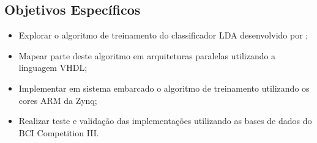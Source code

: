 \subsection{Objetivos Específicos}

\begin{itemize}
	\item Explorar o algoritmo de treinamento do classificador LDA desenvolvido por \cite{F.Lotte};
	\item Mapear parte deste algoritmo em arquiteturas paralelas utilizando a linguagem VHDL;
	\item Implementar em sistema embarcado o algoritmo de treinamento utilizando os cores ARM da Zynq;
	\item Realizar teste e validação das implementações utilizando as bases de dados do BCI Competition III.
\end{itemize}
